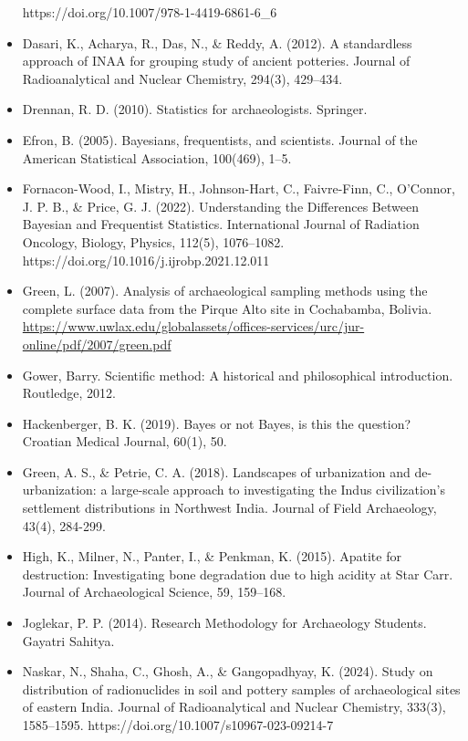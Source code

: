 \documentclass{article}
\begin{document}
\begin{itemize}
    https://doi.org/10.1007/978-1-4419-6861-6\_6
    \item Dasari, K., Acharya, R., Das, N., \& Reddy, A. (2012). A standardless approach of INAA for grouping study of ancient potteries. Journal of Radioanalytical and Nuclear Chemistry, 294(3), 429–434.
    \item Drennan, R. D. (2010). Statistics for archaeologists. Springer.
    \item Efron, B. (2005). Bayesians, frequentists, and scientists. Journal of the American Statistical Association, 100(469), 1–5.
    \item Fornacon-Wood, I., Mistry, H., Johnson-Hart, C., Faivre-Finn, C., O’Connor, J. P. B., \& Price, G. J. (2022). Understanding the Differences Between Bayesian and Frequentist Statistics. International Journal of Radiation Oncology, Biology, Physics, 112(5), 1076–1082. https://doi.org/10.1016/j.ijrobp.2021.12.011
     \item Green, L. (2007). Analysis of archaeological sampling methods using the complete surface data from the Pirque Alto site in Cochabamba, Bolivia. \\
     \href{https://www.uwlax.edu/globalassets/offices-services/urc/jur-online/pdf/2007/green.pdf}{https://www.uwlax.edu/globalassets/offices-services/urc/jur-online/pdf/2007/green.pdf}
    \item Gower, Barry. Scientific method: A historical and philosophical introduction. Routledge, 2012.
    \item Hackenberger, B. K. (2019). Bayes or not Bayes, is this the question? Croatian Medical Journal, 60(1), 50.
    \item Green, A. S., \& Petrie, C. A. (2018). Landscapes of urbanization and de-urbanization: a large-scale approach to investigating the Indus civilization’s settlement distributions in Northwest India. Journal of Field Archaeology, 43(4), 284-299.
    \item High, K., Milner, N., Panter, I., \& Penkman, K. (2015). Apatite for destruction: Investigating bone degradation due to high acidity at Star Carr. Journal of Archaeological Science, 59, 159–168.
    \item Joglekar, P. P. (2014). Research Methodology for Archaeology Students. Gayatri Sahitya.
    \item Naskar, N., Shaha, C., Ghosh, A., \& Gangopadhyay, K. (2024). Study on distribution of radionuclides in soil and pottery samples of archaeological sites of eastern India. Journal of Radioanalytical and Nuclear Chemistry, 333(3), 1585–1595. https://doi.org/10.1007/s10967-023-09214-7

\end{itemize}
\end{document}
